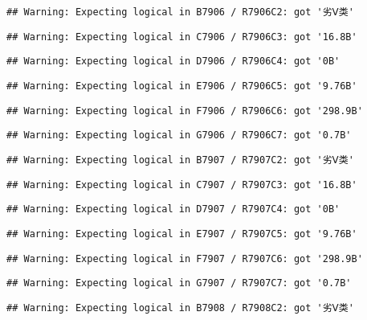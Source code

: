\documentclass[
]{article}
\begin{document}
\begin{verbatim}
## Warning: Expecting logical in B7906 / R7906C2: got '劣Ⅴ类'
\end{verbatim}

\begin{verbatim}
## Warning: Expecting logical in C7906 / R7906C3: got '16.8B'
\end{verbatim}

\begin{verbatim}
## Warning: Expecting logical in D7906 / R7906C4: got '0B'
\end{verbatim}

\begin{verbatim}
## Warning: Expecting logical in E7906 / R7906C5: got '9.76B'
\end{verbatim}

\begin{verbatim}
## Warning: Expecting logical in F7906 / R7906C6: got '298.9B'
\end{verbatim}

\begin{verbatim}
## Warning: Expecting logical in G7906 / R7906C7: got '0.7B'
\end{verbatim}

\begin{verbatim}
## Warning: Expecting logical in B7907 / R7907C2: got '劣Ⅴ类'
\end{verbatim}

\begin{verbatim}
## Warning: Expecting logical in C7907 / R7907C3: got '16.8B'
\end{verbatim}

\begin{verbatim}
## Warning: Expecting logical in D7907 / R7907C4: got '0B'
\end{verbatim}

\begin{verbatim}
## Warning: Expecting logical in E7907 / R7907C5: got '9.76B'
\end{verbatim}

\begin{verbatim}
## Warning: Expecting logical in F7907 / R7907C6: got '298.9B'
\end{verbatim}

\begin{verbatim}
## Warning: Expecting logical in G7907 / R7907C7: got '0.7B'
\end{verbatim}

\begin{verbatim}
## Warning: Expecting logical in B7908 / R7908C2: got '劣Ⅴ类'
\end{verbatim}
\end{document}
